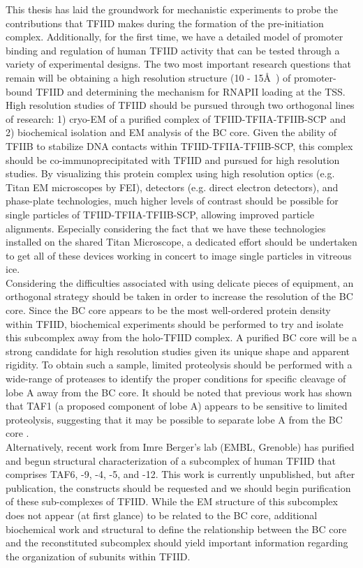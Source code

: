 \indent This thesis has laid the groundwork for mechanistic experiments to probe the contributions that TFIID makes during the formation of the pre-initiation complex. Additionally, for the first time, we have a detailed model of promoter binding and regulation of human TFIID activity that can be tested through a variety of experimental designs. The two most important research questions that remain will be obtaining a high resolution structure (10 - 15\AA\ ) of promoter-bound TFIID and determining the mechanism for RNAPII loading at the TSS.\\
 \indent High resolution studies of TFIID should be pursued through two orthogonal lines of research: 1) cryo-EM of a purified complex of TFIID-TFIIA-TFIIB-SCP and 2) biochemical isolation and EM analysis of the BC core. Given the ability of TFIIB to stabilize DNA contacts within TFIID-TFIIA-TFIIB-SCP, this complex should be co-immunoprecipitated with TFIID and pursued for high resolution studies. By visualizing this protein complex using high resolution optics (e.g. Titan EM microscopes by FEI), detectors (e.g. direct electron detectors), and phase-plate technologies, much higher levels of contrast should be possible for single particles of TFIID-TFIIA-TFIIB-SCP, allowing improved particle alignments. Especially considering the fact that we have these technologies installed on the shared Titan Microscope, a dedicated effort should be undertaken to get all of these devices working in concert to image single particles in vitreous ice.\\
\indent Considering the difficulties associated with using delicate pieces of equipment, an orthogonal strategy should be taken in order to increase the resolution of the BC core. Since the BC core appears to be the most well-ordered protein density within TFIID, biochemical experiments should be performed to try and isolate this subcomplex away from the holo-TFIID complex. A purified BC core will be a strong candidate for high resolution studies given its unique shape and apparent rigidity. To obtain such a sample, limited proteolysis should be performed with a wide-range of proteases to identify the proper conditions for specific cleavage of lobe A away from the BC core. It should be noted that previous work has shown that TAF1 (a proposed component of lobe A) appears to be sensitive to limited proteolysis, suggesting that it may be possible to separate lobe A from the BC core \cite{Ozer_1998}.\\
\indent Alternatively, recent work from Imre Berger's lab (EMBL, Grenoble) has purified and begun structural characterization of a subcomplex of human TFIID that comprises TAF6, -9, -4, -5, and -12. This work is currently unpublished, but after publication, the constructs should be requested and we should begin purification of these sub-complexes of TFIID. While the EM structure of this subcomplex does not appear (at first glance) to be related to the BC core, additional biochemical work and structural to define the relationship between the BC core and the reconstituted subcomplex should yield important information regarding the organization of subunits within TFIID.\\
